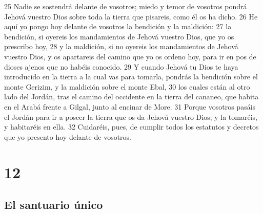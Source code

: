 25 Nadie se sostendrá delante de vosotros; miedo y temor de vosotros pondrá Jehová vuestro Dios sobre toda la tierra que pisareis, como él os ha dicho.
26 He aquí yo pongo hoy delante de vosotros la bendición y la maldición:
27 la bendición, si oyereis los mandamientos de Jehová vuestro Dios, que yo os prescribo hoy,
28 y la maldición, si no oyereis los mandamientos de Jehová vuestro Dios, y os apartareis del camino que yo os ordeno hoy, para ir en pos de dioses ajenos que no habéis conocido.
29 Y cuando Jehová tu Dios te haya introducido en la tierra a la cual vas para tomarla, pondrás la bendición sobre el monte Gerizim, y la maldición sobre el monte Ebal,
30 los cuales están al otro lado del Jordán, tras el camino del occidente en la tierra del cananeo, que habita en el Arabá frente a Gilgal, junto al encinar de More.
31 Porque vosotros pasáis el Jordán para ir a poseer la tierra que os da Jehová vuestro Dios; y la tomaréis, y habitaréis en ella.
32 Cuidaréis, pues, de cumplir todos los estatutos y decretos que yo presento hoy delante de vosotros.

\chapter{12}


\section{El santuario único}


